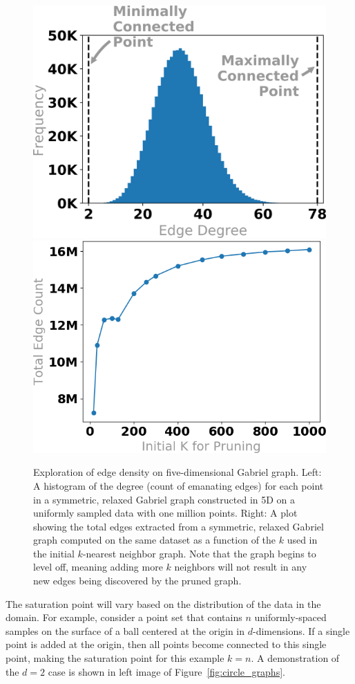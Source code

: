 \begin{figure}[t]
    \centering
      \includegraphics[width=.45\linewidth]{figs/chap7/n-1M_d-5_s-0_k-1000_relaxed_gabriel_histogram.png}
      \includegraphics[width=.45\linewidth]{figs/chap7/saturation_1000000_5D.png}
     \caption[Exploration of edge density on five-dimensional Gabriel graph]{Exploration of edge density on five-dimensional Gabriel graph. 
     Left: A histogram of the degree (count of emanating edges) for each point in a symmetric, relaxed Gabriel graph constructed in 5D on a uniformly sampled data with one million points.
     Right: A plot showing the total edges extracted from a symmetric, relaxed Gabriel graph computed on the same dataset as a function of the $k$ used in the initial $k$-nearest neighbor graph.
     Note that the graph begins to level off, meaning adding more $k$ neighbors will not result in any new edges being discovered by the pruned graph.
     }
    \label{fig:graph_degree}
    \vspace{-4mm}
  \end{figure}

The saturation point will vary based on the distribution of the data in the domain.
%
For example, consider a point set that contains $n$ uniformly-spaced samples
on the surface of a ball centered at the origin in $d$-dimensions.
%
If a single point is added at the origin, then all points become connected to
this single point, making the saturation point for this example $k=n$.
%
A demonstration of the $d=2$ case is shown in left image of Figure~\ref{fig:circle_graphs}.

